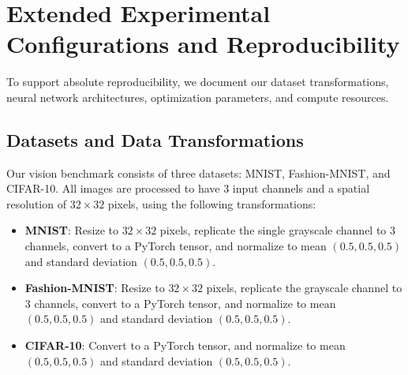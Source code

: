 \documentclass{article}
\theoremstyle{plain}
\theoremstyle{definition}
\theoremstyle{remark}
\begin{document}
\newpage
\section{Extended Experimental Configurations and Reproducibility}
\label{app:experimental_details}

To support absolute reproducibility, we document our dataset transformations, neural network architectures, optimization parameters, and compute resources.

\subsection{Datasets and Data Transformations}
Our vision benchmark consists of three datasets: MNIST, Fashion-MNIST, and CIFAR-10. All images are processed to have 3 input channels and a spatial resolution of $32 \times 32$ pixels, using the following transformations:
\begin{itemize}
    \item \textbf{MNIST}: Resize to $32 \times 32$ pixels, replicate the single grayscale channel to 3 channels, convert to a PyTorch tensor, and normalize to mean $(0.5, 0.5, 0.5)$ and standard deviation $(0.5, 0.5, 0.5)$.
    \item \textbf{Fashion-MNIST}: Resize to $32 \times 32$ pixels, replicate the grayscale channel to 3 channels, convert to a PyTorch tensor, and normalize to mean $(0.5, 0.5, 0.5)$ and standard deviation $(0.5, 0.5, 0.5)$.
    \item \textbf{CIFAR-10}: Convert to a PyTorch tensor, and normalize to mean $(0.5, 0.5, 0.5)$ and standard deviation $(0.5, 0.5, 0.5)$.
\end{itemize}
\end{document}
